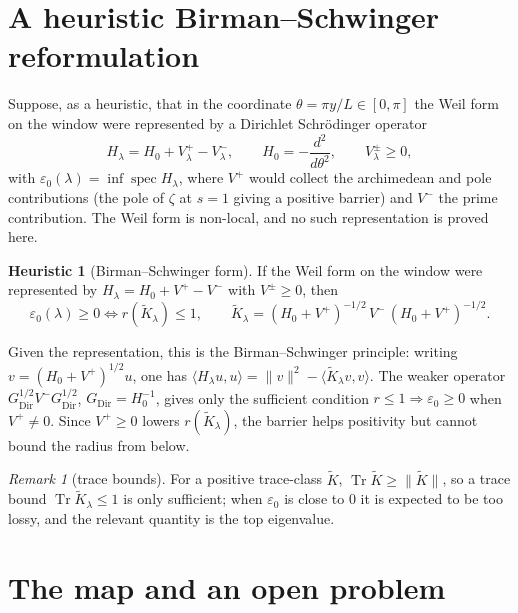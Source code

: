 \documentclass[11pt]{amsart}
\theoremstyle{definition}
\newtheorem{heuristic}[theorem]{Heuristic}
\theoremstyle{remark}
\newtheorem{remark}[theorem]{Remark}
\newcommand{\eps}{\varepsilon}
\newcommand{\Tr}{\operatorname{Tr}}
\begin{document}
\section{A heuristic Birman--Schwinger reformulation}
Suppose, as a heuristic, that in the coordinate $\theta=\pi y/L\in[0,\pi]$ the Weil form on the
window were represented by a Dirichlet Schr\"odinger operator
\[
   H_\lambda=H_0+V^+_\lambda-V^-_\lambda,\qquad H_0=-\frac{d^2}{d\theta^2},\qquad V^\pm_\lambda\ge0,
\]
with $\eps_0(\lambda)=\inf\operatorname{spec}H_\lambda$, where $V^+$ would collect the
archimedean and pole contributions (the pole of $\zeta$ at $s=1$ giving a positive barrier) and
$V^-$ the prime contribution. The Weil form is non-local, and no such representation is proved
here.

\begin{heuristic}[Birman--Schwinger form]\label{prop:bs}
If the Weil form on the window were represented by $H_\lambda=H_0+V^+-V^-$ with $V^\pm\ge0$, then
\[
   \eps_0(\lambda)\ge0\iff r(\tilde K_\lambda)\le1,\qquad
   \tilde K_\lambda=(H_0+V^+)^{-1/2}\,V^-\,(H_0+V^+)^{-1/2}.
\]
\end{heuristic}
\noindent Given the representation, this is the Birman--Schwinger principle: writing $v=(H_0+V^+)^{1/2}u$,
one has
$\langle H_\lambda u,u\rangle=\|v\|^2-\langle\tilde K_\lambda v,v\rangle$. The weaker operator
$G_{\mathrm{Dir}}^{1/2}V^-G_{\mathrm{Dir}}^{1/2}$, $G_{\mathrm{Dir}}=H_0^{-1}$, gives only the
sufficient condition $r\le1\Rightarrow\eps_0\ge0$ when $V^+\ne0$. Since $V^+\ge0$ lowers
$r(\tilde K_\lambda)$, the barrier helps positivity but cannot bound the radius from below.

\begin{remark}[trace bounds]
For a positive trace-class $\tilde K$, $\Tr\tilde K\ge\|\tilde K\|$, so a trace bound
$\Tr\tilde K_\lambda\le1$ is only sufficient; when $\eps_0$ is close to $0$ it is expected to be
too lossy, and the relevant quantity is the top eigenvalue.
\end{remark}

\section{The map and an open problem}
\end{document}
